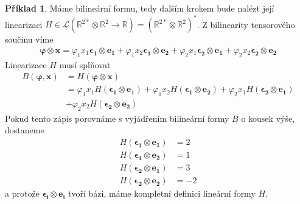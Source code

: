\documentclass[a5paper,12pt]{amsbook}
\theoremstyle{definition}
\newtheorem{example}{Příklad}[chapter]
\newcommand{\myvec}[1]{\bm{#1}}
\newcommand{\myspace}[1]{\mathbb{#1}}
\begin{document}
\begin{example}
Máme bilineární formu, tedy dalším krokem bude nalézt její linearizaci
$H\in\mathcal{L}(\myspace{R}^{2*}\otimes\myspace{R}^2\rightarrow\myspace{R}) 
 = (\myspace{R}^{2*}\otimes\myspace{R}^2)^*$. Z bilinearity tensorového součinu víme
\begin{equation*}
\begin{split}
\myvec{\varphi}\otimes\myvec{x} = \varphi_1 x_1\myvec{\epsilon_1}\otimes\myvec{e_1}
 + \varphi_1 x_2\myvec{\epsilon_1}\otimes\myvec{e_2}
 + \varphi_2 x_1\myvec{\epsilon_2}\otimes\myvec{e_1}
 + \varphi_2 x_2\myvec{\epsilon_2}\otimes\myvec{e_2}
\end{split}
\end{equation*}
Linearizace $H$ musí splňovat
\begin{equation*}
\begin{split}
B(\myvec{\varphi}, \myvec{x}) &= H(\myvec{\varphi}\otimes\myvec{x}) \\
  &= \varphi_1 x_1 H(\myvec{\epsilon_1}\otimes\myvec{e_1})
    + \varphi_1 x_2 H(\myvec{\epsilon_1}\otimes\myvec{e_2})
    + \varphi_2 x_1 H(\myvec{\epsilon_2}\otimes\myvec{e_1}) \\
    &+ \varphi_2 x_2 H(\myvec{\epsilon_2}\otimes\myvec{e_2})
\end{split}
\end{equation*}
Pokud tento zápis porovnáme s vyjádřením bilineární formy $B$ o kousek výše, dostaneme
\begin{equation*}
\begin{split}
H(\myvec{\epsilon_1}\otimes\myvec{e_1}) &= 2 \\
H(\myvec{\epsilon_1}\otimes\myvec{e_2}) &= 1 \\
H(\myvec{\epsilon_2}\otimes\myvec{e_1}) &= 3 \\
H(\myvec{\epsilon_2}\otimes\myvec{e_2}) &= -2
\end{split}
\end{equation*}
a protože $\myvec{\epsilon_i}\otimes\myvec{e_i}$ tvoří bázi, máme kompletní definici
lineární formy $H$.


\end{example}
\end{document}

